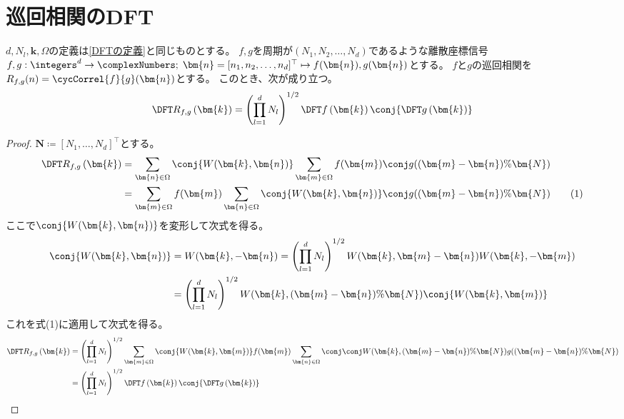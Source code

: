     \section{巡回相関のDFT}
    \label{巡回相関のDFT}
        \begin{shadebox}
            $d,N_l,\bm{k},\Omega$の定義は\ref{DFTの定義}と同じものとする。
            $f,g$を周期が$(N_1,N_2,\dots,N_d)$であるような離散座標信号$f,g: \integers^d\to\complexNumbers;\;\bm{n} = [n_1,n_2,\dots,n_d]^\top \mapsto f(\bm{n}),g(\bm{n})$とする。
            $f$と$g$の巡回相関を$R_{f,g}(n) = \cycCorrel{f}{g}(\bm{n})$とする。
            このとき、次が成り立つ。
            \[ \DFTwithArg{R_{f,g}}{\bm{k}} = \left(\prod_{l=1}^d N_l\right)^{1/2}\DFTwithArg{f}{\bm{k}}\conj{\DFTwithArg{g}{\bm{k}}} \]
        \end{shadebox}
        \begin{proof}
            \quad\par
            $\bm{N} \coloneqq [N_1,\dots,N_d]^\top$とする。
            \begin{align*}
                \DFTwithArg{R_{f,g}}{\bm{k}} &= \sum_{\bm{n}\in\Omega} \conj{W(\bm{k},\bm{n})} \sum_{\bm{m}\in\Omega} f(\bm{m})\conj{g((\bm{m}-\bm{n})\%\bm{N})} \\
                &= \sum_{\bm{m}\in\Omega} f(\bm{m}) \sum_{\bm{n}\in\Omega} \conj{W(\bm{k},\bm{n})}\conj{g((\bm{m}-\bm{n})\%\bm{N})} \tag{1}
            \end{align*}
            ここで$\conj{W(\bm{k},\bm{n})}$を変形して次式を得る。
            \begin{align*}
                \conj{W(\bm{k},\bm{n})} &= W(\bm{k},-\bm{n}) = \left(\prod_{l=1}^d N_l\right)^{1/2}W(\bm{k},\bm{m}-\bm{n})W(\bm{k},-\bm{m}) \\
                &= \left(\prod_{l=1}^d N_l\right)^{1/2}W(\bm{k},(\bm{m}-\bm{n})\%\bm{N})\conj{W(\bm{k},\bm{m})}
            \end{align*}
            これを式(1)に適用して次式を得る。
            \begin{align*}
                \DFTwithArg{R_{f,g}}{\bm{k}} &= \left(\prod_{l=1}^d N_l\right)^{1/2} \sum_{\bm{m}\in\Omega} \conj{W(\bm{k},\bm{m})}f(\bm{m}) \sum_{\bm{n}\in\Omega}\conj{\conj{W(\bm{k},(\bm{m}-\bm{n})\%\bm{N})}g((\bm{m}-\bm{n})\%\bm{N})} \\
                &= \left(\prod_{l=1}^d N_l\right)^{1/2}\DFTwithArg{f}{\bm{k}}\conj{\DFTwithArg{g}{\bm{k}}}
            \end{align*}
        \end{proof}
